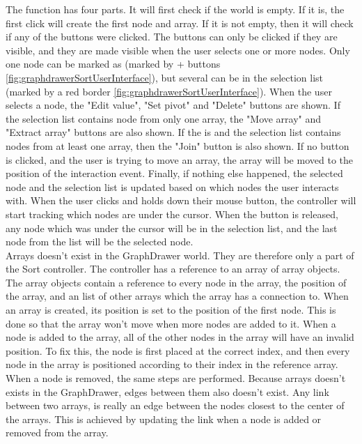 The  function has four parts. It will first check if the world is empty. If it is, the first click will create the first node and array. If it is not empty, then it will check if any of the buttons were clicked. The buttons can only be clicked if they are visible, and they are made visible when the user selects one or more nodes. Only one node can be marked as  (marked by + buttons \ref{fig:graphdrawerSortUserInterface}), but several can be in the selection list (marked by a red border \ref{fig:graphdrawerSortUserInterface}). When the user selects a node, the "Edit value", "Set pivot" and "Delete" buttons are shown. If the selection list contains node from only one array, the "Move array" and "Extract array" buttons are also shown. If the  is  and the selection list contains nodes from at least one array, then the "Join" button is also shown. If no button is clicked, and the user is trying to move an array, the array will be moved to the position of the interaction event. Finally, if nothing else happened, the selected node and the selection list is updated based on which nodes the user interacts with. When the user clicks and holds down their mouse button, the controller will start tracking which nodes are under the cursor. When the button is released, any node which was under the cursor will be in the selection list, and the last node from the list will be the selected node.
\\[11pt]
Arrays doesn't exist in the GraphDrawer world. They are therefore only a part of the Sort controller. The controller has a reference to an array of array objects. The array objects contain a reference to every node in the array, the position of the array, and an list of other arrays which the array has a connection to. When an array is created, its position is set to the position of the first node. This is done so that the array won't move when more nodes are added to it. When a node is added to the array, all of the other nodes in the array will have an invalid position. To fix this, the node is first placed at the correct index, and then every node in the array is positioned according to their index in the reference array. When a node is removed, the same steps are performed. Because arrays doesn't exists in the GraphDrawer, edges between them also doesn't exist. Any link between two arrays, is really an edge between the nodes closest to the center of the arrays. This is achieved by updating the link when a node is added or removed from the array.
\\[11pt]
